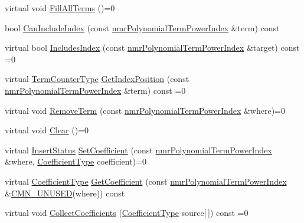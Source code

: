 \begin{DoxyCompactItemize}
\item 
virtual void \hyperlink{classnmr_polynomial_base_a9f0bc5fa29d3e7ff670162f23e9f28d3}{Fill\+All\+Terms} ()=0
\item 
bool \hyperlink{classnmr_polynomial_base_a9547fed45ba78883ab65594bcd46505c}{Can\+Include\+Index} (const \hyperlink{classnmr_polynomial_term_power_index}{nmr\+Polynomial\+Term\+Power\+Index} \&term) const 
\item 
virtual bool \hyperlink{classnmr_polynomial_base_a4530609f1461afe98e49d8899bfe216a}{Includes\+Index} (const \hyperlink{classnmr_polynomial_term_power_index}{nmr\+Polynomial\+Term\+Power\+Index} \&target) const =0
\item 
virtual \hyperlink{classnmr_polynomial_base_a4b0abd66b12b6f5bfb30d0eb1607e661}{Term\+Counter\+Type} \hyperlink{classnmr_polynomial_base_abc7652cef60def42b5f327536bb483e9}{Get\+Index\+Position} (const \hyperlink{classnmr_polynomial_term_power_index}{nmr\+Polynomial\+Term\+Power\+Index} \&term) const =0
\item 
virtual void \hyperlink{classnmr_polynomial_base_ad329db0b6a9372a6f2eb093f8c2272ac}{Remove\+Term} (const \hyperlink{classnmr_polynomial_term_power_index}{nmr\+Polynomial\+Term\+Power\+Index} \&where)=0
\item 
virtual void \hyperlink{classnmr_polynomial_base_a432db50d77044c8e092e273e07abd898}{Clear} ()=0
\item 
virtual \hyperlink{classnmr_polynomial_base_ac3b6b28653104ea70419279a35580940}{Insert\+Status} \hyperlink{classnmr_polynomial_base_ac48244b385d53d08c25fed757ca7ba6a}{Set\+Coefficient} (const \hyperlink{classnmr_polynomial_term_power_index}{nmr\+Polynomial\+Term\+Power\+Index} \&where, \hyperlink{classnmr_polynomial_base_a8693efdfc8585ccb49abea69f74f3eef}{Coefficient\+Type} coefficient)=0
\item 
virtual \hyperlink{classnmr_polynomial_base_a8693efdfc8585ccb49abea69f74f3eef}{Coefficient\+Type} \hyperlink{classnmr_polynomial_base_a44843c32a65c62b2124851b1ca83ceae}{Get\+Coefficient} (const \hyperlink{classnmr_polynomial_term_power_index}{nmr\+Polynomial\+Term\+Power\+Index} \&\hyperlink{cmn_portability_8h_a021894e2626935fa2305434b1e893ff6}{C\+M\+N\+\_\+\+U\+N\+U\+S\+E\+D}(where)) const 
\item 
virtual void \hyperlink{classnmr_polynomial_base_a0e387415f60457ed1e410a1aac35a159}{Collect\+Coefficients} (\hyperlink{classnmr_polynomial_base_a8693efdfc8585ccb49abea69f74f3eef}{Coefficient\+Type} source\mbox{[}$\,$\mbox{]}) const =0
\item 

\end{DoxyCompactItemize}
